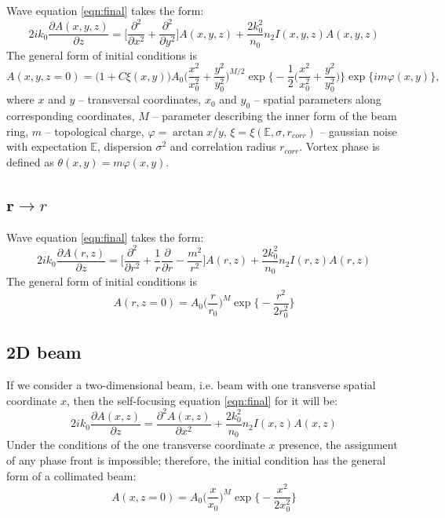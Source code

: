 \documentclass[a4paper, 12pt]{article}
\begin{document}
Wave equation \eqref{eqn:final} takes the form:
\begin{equation}
2 i k_0 \frac{\partial A (x, y, z)}{\partial z} = \biggl[ \frac{\partial^2}{\partial x^2} + \frac{\partial^2}{\partial y^2} \biggr] A (x, y, z) + \frac{2 k_0^2}{n_0} n_2 I(x, y, z) A(x, y, z)
\end{equation}
The general form of initial conditions is
\begin{equation}
\label{eqn:initial_xy}
A(x,y, z = 0) = \biggl(1 + C \xi(x,y)\biggr)A_0 \biggl(\frac{x^2}{x_0^2}+\frac{y^2}{y_0^2}\biggr)^{M/2}\exp\biggl\{-\frac1{2}\biggl(\frac{x^2}{x_0^2}+\frac{y^2}{y_0^2}\biggr)\biggr\}\exp\biggl\{i m \varphi(x,y)\biggr\},
\end{equation}
where $x$ and $y$ -- transversal coordinates, $x_0$ and $y_0$ -- spatial parameters along corresponding coordinates, $M$ -- parameter describing the inner form of the beam ring, $m$ -- topological charge, $\varphi=\arctan{x/y}$, $\xi=\xi(\mathbb{E}, \sigma, r_{corr})$ -- gaussian noise with expectation $\mathbb{E}$, dispersion $\sigma^2$ and correlation radius $r_{corr}$. Vortex phase is defined as $\theta(x,y) = m \varphi(x,y)$.


\subsection{$\mathbf{r}\longrightarrow r$}

Wave equation \eqref{eqn:final} takes the form:
\begin{equation}
2 i k_0 \frac{\partial A (r, z)}{\partial z} = \biggl[ \frac{\partial^2}{\partial r^2} + \frac1{r}\frac{\partial}{\partial r} - \frac{m^2}{r^2} \biggr] A (r, z) + \frac{2 k_0^2}{n_0} n_2 I(r, z) A(r, z)
\end{equation}
The general form of initial conditions is
\begin{equation}
A(r,z=0) = A_0 \biggl( \frac{r}{r_0} \biggr)^M \exp \biggl\{ -\frac{r^2}{2r_0^2} \biggr\}
\end{equation}

\subsection{2D beam}

If we consider a two-dimensional beam, i.e. beam with one transverse spatial coordinate $x$, then the self-focusing equation \eqref{eqn:final} for it will be:
\begin{equation}
2 i k_0 \frac{\partial A (x, z)}{\partial z} = \frac{\partial^2 A (x, z)}{\partial x^2} + \frac{2 k_0^2}{n_0} n_2 I(x, z) A(x, z)
\end{equation}
Under the conditions of the one transverse coordinate $x$ presence, the assignment of any phase front is impossible; therefore, the initial condition has the general form of a collimated beam:
\begin{equation}
A(x,z=0) = A_0 \biggl( \frac{x}{x_0} \biggr)^M \exp \biggl\{ -\frac{x^2}{2x_0^2} \biggr\}
\end{equation}
\end{document}
